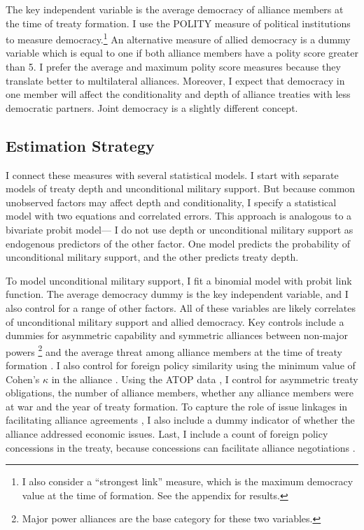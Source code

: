 \documentclass[12pt]{article}
\begin{document}
The key independent variable is the average democracy of alliance members at the time of treaty formation. 
I use the POLITY measure of political institutions to measure democracy.\footnote{I also consider a ``strongest link'' measure, which is the maximum democracy value at the time of formation. See the appendix for results.} 
An alternative measure of allied democracy is a dummy variable which is equal to one if both alliance members have a polity score greater than 5. 
I prefer the average and maximum polity score measures because they translate better to multilateral alliances. 
Moreover, I expect that democracy in one member will affect the conditionality and depth of alliance treaties with less democratic partners.
Joint democracy is a slightly different concept. 



\subsection{Estimation Strategy}

I connect these measures with several statistical models. 
I start with separate models of treaty depth and unconditional military support. 
But because common unobserved factors may affect depth and conditionality, I specify a statistical model with two equations and correlated errors.
This approach is analogous to a bivariate probit model--- I do not use depth or unconditional military support as endogenous predictors of the other factor. 
One model predicts the probability of unconditional military support, and the other predicts treaty depth.


To model unconditional military support, I fit a binomial model with probit link function. 
The average democracy dummy is the key independent variable, and I also control for a range of other factors.
All of these variables are likely correlates of unconditional military support and allied democracy. 
Key controls include a dummies for asymmetric capability and symmetric alliances between non-major powers \citep{Mattes2012}\footnote{Major power alliances are the base category for these two variables.} and the average threat among alliance members at the time of treaty formation \citep{LeedsSavun2007}. 
I also control for foreign policy similarity \citep{Benson2012} using the minimum value of Cohen's $\kappa$ in the alliance \citep{Hage2011}.
Using the ATOP data \citep{Leedsetal2002}, I control for asymmetric treaty obligations, the number of alliance members, whether any alliance members were at war and the year of treaty formation. 
To capture the role of issue linkages in facilitating alliance agreements \citep{Poast2012, Poast2013}, I also include a dummy indicator of whether the alliance addressed economic issues.  
Last, I include a count of foreign policy concessions in the treaty, because concessions can facilitate alliance negotiations \citep{Johnson2015}. 
\end{document}

